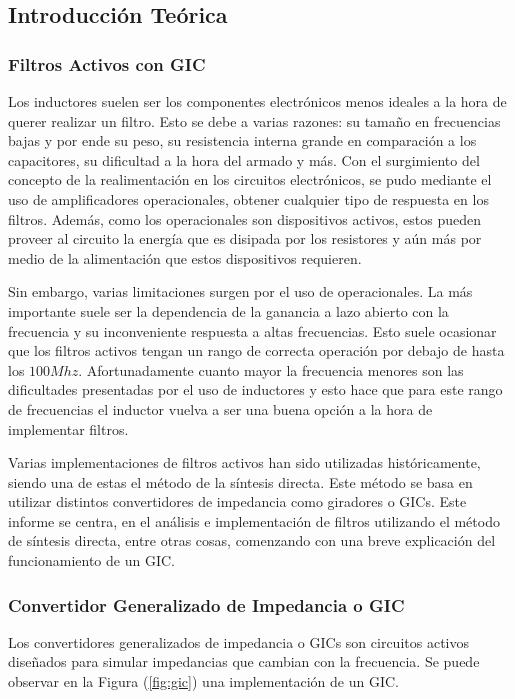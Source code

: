 


\subsection{Introducción Teórica}

\subsubsection{Filtros Activos con GIC}

Los inductores suelen ser los componentes electrónicos menos ideales a la hora de querer realizar un filtro. Esto se debe a varias razones: su tamaño en frecuencias bajas y por ende su peso, su resistencia interna grande en comparación a los capacitores, su dificultad a la hora del armado y más. Con el surgimiento del concepto de la realimentación en los circuitos electrónicos, se pudo mediante el uso de amplificadores operacionales, obtener cualquier tipo de respuesta en los filtros. Además, como los operacionales son dispositivos activos, estos pueden proveer al circuito la energía que es disipada por los resistores y aún más por medio de la alimentación que estos dispositivos requieren.

Sin embargo, varias limitaciones surgen por el uso de operacionales. La más importante suele ser la dependencia de la ganancia a lazo abierto con la frecuencia y su inconveniente respuesta a altas frecuencias. Esto suele ocasionar que los filtros activos tengan un rango de correcta operación por debajo de hasta los $100Mhz$. Afortunadamente cuanto mayor la frecuencia menores son las dificultades presentadas por el uso de inductores y esto hace que para este rango de frecuencias el inductor vuelva a ser una buena opción a la hora de implementar filtros.

Varias implementaciones de filtros activos han sido utilizadas históricamente, siendo una de estas el método de la síntesis directa. Este método se basa en utilizar distintos convertidores de impedancia como giradores o GICs. Este informe se centra, en el análisis e implementación de filtros utilizando el método de síntesis directa, entre otras cosas, comenzando con una breve explicación del funcionamiento de un GIC.

\subsubsection{Convertidor Generalizado de Impedancia o GIC}
Los convertidores generalizados de impedancia o GICs son circuitos activos diseñados para simular impedancias que cambian con la frecuencia. Se puede observar en la Figura (\ref{fig:gic}) una implementación de un GIC.

